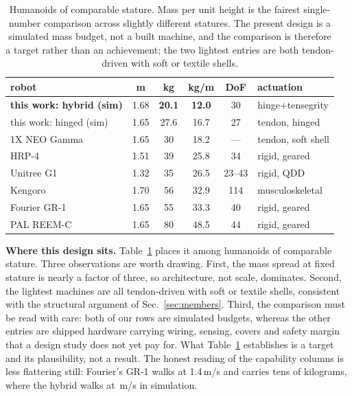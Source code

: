 \documentclass[conference]{IEEEtran}
\begin{document}
\begin{table}[tb]
\centering
\caption{Humanoids of comparable stature. Mass per unit height is the fairest
single-number comparison across slightly different statures. The present
design is a simulated mass budget, not a built machine, and the comparison is
therefore a target rather than an achievement; the two lightest entries are
both tendon-driven with soft or textile shells.}
\label{tab:compare}
\setlength{\tabcolsep}{2.6pt}\footnotesize%
\begin{tabular}{@{}lccccl@{}}
\toprule
robot & m & kg & kg/m & DoF & actuation\\
\midrule
\textbf{this work: hybrid (sim)} & 1.68 & \textbf{20.1} & \textbf{12.0} &
30 & hinge$+$tensegrity\\
this work: hinged (sim) & 1.65 & 27.6 & 16.7 & 27 & tendon, hinged\\
1X NEO Gamma \cite{onex2025neo} & 1.65 & 30 & 18.2 & --- & tendon, soft shell\\
HRP-4 \cite{kaneko2011hrp4} & 1.51 & 39 & 25.8 & 34 & rigid, geared\\
Unitree G1 \cite{unitree2024g1} & 1.32 & 35 & 26.5 & 23--43 & rigid, QDD\\
Kengoro \cite{asano2017kengoro} & 1.70 & 56 & 32.9 & 114 & musculoskeletal\\
Fourier GR-1 \cite{fourier2023gr1} & 1.65 & 55 & 33.3 & 40 & rigid, geared\\
PAL REEM-C \cite{pal2013reemc} & 1.65 & 80 & 48.5 & 44 & rigid, geared\\
\bottomrule
\end{tabular}
\end{table}

\textbf{Where this design sits.} Table~\ref{tab:compare} places it among
humanoids of comparable stature. Three observations are worth drawing. First, the mass
spread at fixed stature is nearly a factor of three, so architecture, not
scale, dominates. Second, the lightest machines are all tendon-driven with
soft or textile shells, consistent with the structural argument of
Sec.~\ref{sec:members}. Third, the comparison must be read with care: both of
our rows are simulated budgets, whereas the other entries are shipped
hardware carrying wiring, sensing, covers and safety margin that a design
study does not yet pay for. What Table~\ref{tab:compare} establishes is a
target and its plausibility, not a result. The honest reading of the
capability columns is less flattering still: Fourier's GR-1 walks at
1.4\,m/s and carries tens of kilograms, where the hybrid walks at
\hybridSpeed\,m/s in simulation.
\end{document}
